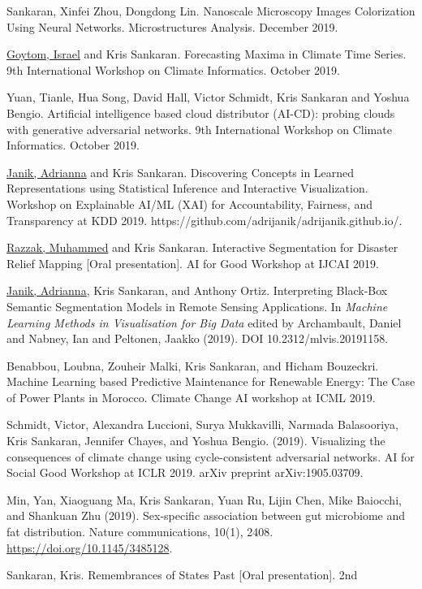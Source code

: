 \documentclass[letterpaper]{article}
\renewenvironment{itemize}{
  \begin{list}{}{
    \setlength{\leftmargin}{1.5em}
  }
}{
  \end{list}
}
\begin{document}
\begin{itemize}
Sankaran, Xinfei Zhou, Dongdong Lin. Nanoscale Microscopy Images Colorization
Using Neural Networks. Microstructures Analysis. December 2019.
\item \underline{Goytom, Israel} and Kris Sankaran. Forecasting Maxima in
Climate Time Series. 9th International Workshop on Climate Informatics.
October 2019.
\item Yuan, Tianle, Hua Song, David Hall, Victor Schmidt, Kris Sankaran and
  Yoshua Bengio. Artificial intelligence based cloud distributor (AI-CD):
  probing clouds with generative adversarial networks. 9th International
  Workshop on Climate Informatics. October 2019.
\item \underline{Janik, Adrianna} and Kris Sankaran. Discovering Concepts in
Learned Representations using Statistical Inference and Interactive
Visualization. Workshop on Explainable AI/ML (XAI) for Accountability,
Fairness, and Transparency at KDD 2019.
https://github.com/adrijanik/adrijanik.github.io/.
\item \underline{Razzak, Muhammed} and Kris Sankaran. Interactive Segmentation
for Disaster Relief Mapping [Oral presentation]. AI for Good Workshop at IJCAI
2019.
\item \underline{Janik, Adrianna}, Kris Sankaran, and Anthony Ortiz.
Interpreting Black-Box Semantic Segmentation Models in Remote Sensing
Applications. In \textit{Machine Learning Methods in Visualisation for Big
Data} edited by Archambault, Daniel and Nabney, Ian and Peltonen, Jaakko
(2019). DOI 10.2312/mlvis.20191158.
\item Benabbou, Loubna, Zouheir Malki, Kris Sankaran, and Hicham Bouzeckri.
  Machine Learning based Predictive Maintenance for Renewable Energy: The Case
  of Power Plants in Morocco. Climate Change AI workshop at ICML 2019.
\item Schmidt, Victor, Alexandra Luccioni, Surya Mukkavilli, Narmada
  Balasooriya, Kris Sankaran, Jennifer Chayes, and Yoshua Bengio. (2019).
  Visualizing the consequences of climate change using cycle-consistent
  adversarial networks. AI for Social Good Workshop at ICLR 2019. arXiv
  preprint arXiv:1905.03709.
\item Min, Yan, Xiaoguang Ma, Kris Sankaran, Yuan Ru, Lijin Chen, Mike
  Baiocchi, and Shankuan Zhu (2019). Sex-specific association between gut
  microbiome and fat distribution. Nature communications, 10(1), 2408.
\href{https://doi.org/10.1145/3485128}{https://doi.org/10.1145/3485128}.
\item Sankaran, Kris. Remembrances of States Past [Oral presentation]. 2nd

\end{itemize}
\end{document}
